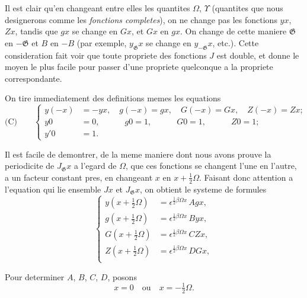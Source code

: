 \documentclass[11pt,a4paper]{book}
\begin{document}
Il est clair qu'en changeant entre elles les quantites $\Omega$, $\Upsilon$ (quantites que nous
designerons comme les \textit{fonctions completes}), on ne change pas les fonctions $yx$, $Zx$,
tandis que $gx$ se change en $Gx$, et $Gx$ en $gx$. On change de cette maniere $\mathfrak{G}$ en $-\mathfrak{G}$
et $B$ en $-B$ (par exemple, $y_{\mathfrak{G}}x$ se change en $y_{-\mathfrak{G}}x$, etc.). Cette consideration fait voir
que toute propriete des fonctions $J$ est double, et donne le moyen le plus facile pour
passer d'une propriete quelconque a la propriete correspondante.

On tire immediatement des definitions memes les equations
\begin{equation*}
\text{(C)}\qquad
\left\{
\begin{aligned}
y(-x) &= -yx,\quad g(-x) = gx,\quad G(-x) = Gx,\quad Z(-x) = Zx;\\
y0 &= 0,\qquad\quad g0 = 1,\qquad\quad G0 = 1,\qquad\quad Z0 = 1;\\
y'0 &= 1.
\end{aligned}
\right.
\end{equation*}

Il est facile de demontrer, de la meme maniere dont nous avons prouve la periodicite
de $J_{\mathfrak{G}}x$ a l'egard de $\Omega$, que ces fonctions se changent l'une en l'autre, a un facteur
constant pres, en changeant $x$ en $x + \frac{1}{2}\Omega$. Faisant donc attention a l'equation qui lie
ensemble $Jx$ et $J_{\mathfrak{G}}x$, on obtient le systeme de formules
\begin{equation}
\left\{
\begin{aligned}
y\left(x + \tfrac{1}{2}\Omega\right) &= \epsilon^{\frac{1}{2}\beta\Omega x}\, Agx,\\
g\left(x + \tfrac{1}{2}\Omega\right) &= \epsilon^{\frac{1}{2}\beta\Omega x}\, Byx,\\
G\left(x + \tfrac{1}{2}\Omega\right) &= \epsilon^{\frac{1}{2}\beta\Omega x}\, CZx,\\
Z\left(x + \tfrac{1}{2}\Omega\right) &= \epsilon^{\frac{1}{2}\beta\Omega x}\, DGx,\\
\end{aligned}
\right. \tag{22}
\end{equation}

Pour determiner $A$, $B$, $C$, $D$, posons
\[x = 0\quad \text{ou}\quad x = -\tfrac{1}{2}\Omega.\]
\end{document}
